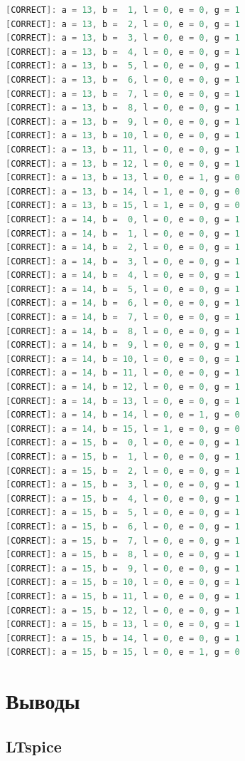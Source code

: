 \documentclass[12pt,onecolumn]{article}
\begin{document}
\begin{lstlisting}[style=verilog, language=Verilog]
[CORRECT]: a = 13, b =  1, l = 0, e = 0, g = 1
[CORRECT]: a = 13, b =  2, l = 0, e = 0, g = 1
[CORRECT]: a = 13, b =  3, l = 0, e = 0, g = 1
[CORRECT]: a = 13, b =  4, l = 0, e = 0, g = 1
[CORRECT]: a = 13, b =  5, l = 0, e = 0, g = 1
[CORRECT]: a = 13, b =  6, l = 0, e = 0, g = 1
[CORRECT]: a = 13, b =  7, l = 0, e = 0, g = 1
[CORRECT]: a = 13, b =  8, l = 0, e = 0, g = 1
[CORRECT]: a = 13, b =  9, l = 0, e = 0, g = 1
[CORRECT]: a = 13, b = 10, l = 0, e = 0, g = 1
[CORRECT]: a = 13, b = 11, l = 0, e = 0, g = 1
[CORRECT]: a = 13, b = 12, l = 0, e = 0, g = 1
[CORRECT]: a = 13, b = 13, l = 0, e = 1, g = 0
[CORRECT]: a = 13, b = 14, l = 1, e = 0, g = 0
[CORRECT]: a = 13, b = 15, l = 1, e = 0, g = 0
[CORRECT]: a = 14, b =  0, l = 0, e = 0, g = 1
[CORRECT]: a = 14, b =  1, l = 0, e = 0, g = 1
[CORRECT]: a = 14, b =  2, l = 0, e = 0, g = 1
[CORRECT]: a = 14, b =  3, l = 0, e = 0, g = 1
[CORRECT]: a = 14, b =  4, l = 0, e = 0, g = 1
[CORRECT]: a = 14, b =  5, l = 0, e = 0, g = 1
[CORRECT]: a = 14, b =  6, l = 0, e = 0, g = 1
[CORRECT]: a = 14, b =  7, l = 0, e = 0, g = 1
[CORRECT]: a = 14, b =  8, l = 0, e = 0, g = 1
[CORRECT]: a = 14, b =  9, l = 0, e = 0, g = 1
[CORRECT]: a = 14, b = 10, l = 0, e = 0, g = 1
[CORRECT]: a = 14, b = 11, l = 0, e = 0, g = 1
[CORRECT]: a = 14, b = 12, l = 0, e = 0, g = 1
[CORRECT]: a = 14, b = 13, l = 0, e = 0, g = 1
[CORRECT]: a = 14, b = 14, l = 0, e = 1, g = 0
[CORRECT]: a = 14, b = 15, l = 1, e = 0, g = 0
[CORRECT]: a = 15, b =  0, l = 0, e = 0, g = 1
[CORRECT]: a = 15, b =  1, l = 0, e = 0, g = 1
[CORRECT]: a = 15, b =  2, l = 0, e = 0, g = 1
[CORRECT]: a = 15, b =  3, l = 0, e = 0, g = 1
[CORRECT]: a = 15, b =  4, l = 0, e = 0, g = 1
[CORRECT]: a = 15, b =  5, l = 0, e = 0, g = 1
[CORRECT]: a = 15, b =  6, l = 0, e = 0, g = 1
[CORRECT]: a = 15, b =  7, l = 0, e = 0, g = 1
[CORRECT]: a = 15, b =  8, l = 0, e = 0, g = 1
[CORRECT]: a = 15, b =  9, l = 0, e = 0, g = 1
[CORRECT]: a = 15, b = 10, l = 0, e = 0, g = 1
[CORRECT]: a = 15, b = 11, l = 0, e = 0, g = 1
[CORRECT]: a = 15, b = 12, l = 0, e = 0, g = 1
[CORRECT]: a = 15, b = 13, l = 0, e = 0, g = 1
[CORRECT]: a = 15, b = 14, l = 0, e = 0, g = 1
[CORRECT]: a = 15, b = 15, l = 0, e = 1, g = 0
\end{lstlisting}

\section{Выводы}
\subsection{LTspice}
\end{document}
